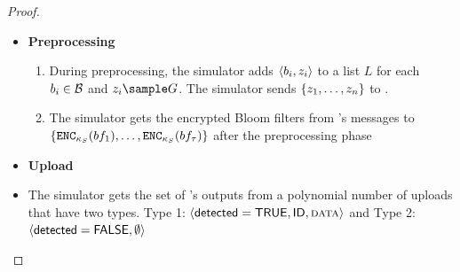 \begin{proof}
\begin{itemize}
\item \textbf{Preprocessing}
\begin{enumerate}[resume]
\item During preprocessing, the simulator adds $\langle \genericBlocklistElmt_\setIdx, \genericCInputElmtPRFEval_\setIdx \rangle$ to a list $L$ for each $\genericBlocklistElmt_\setIdx \in \blocklist$ and $\genericCInputElmtPRFEval_\setIdx \sample \group$. The simulator sends $\{ z_1, \dots, z_n \}$ to \server. 
\item The simulator gets the encrypted Bloom filters from \server's messages to \client $\{\encrypt[\bloomFilterKey](\bloomFilter[1]), \dots, \encrypt[\bloomFilterKey](\bloomFilter[\numBlocklistParts])\}$ after the preprocessing phase
\end{enumerate}

\item \textbf{Upload}
\item The simulator gets the set of \server's outputs from a polynomial number of uploads that have two types. Type 1: $\langle \detected = \tru, \genericFileID, \clientData \rangle$ and Type 2: $\langle \mathsf{detected} = \mathsf{FALSE}, \emptyset \rangle$


\end{itemize}
\end{proof}
